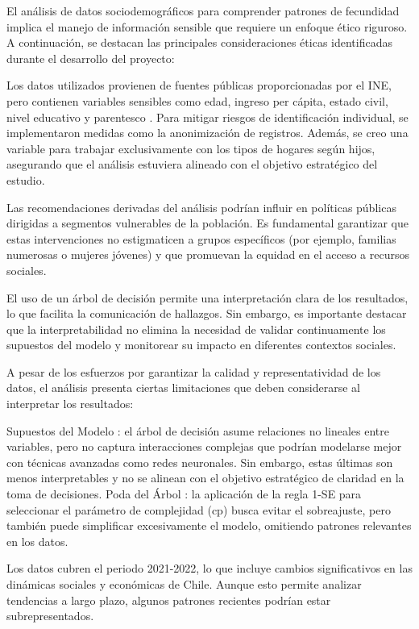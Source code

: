 \documentclass[
]{article}
\begin{document}
El análisis de datos sociodemográficos para comprender patrones de
fecundidad implica el manejo de información sensible que requiere un
enfoque ético riguroso. A continuación, se destacan las principales
consideraciones éticas identificadas durante el desarrollo del proyecto:

Los datos utilizados provienen de fuentes públicas proporcionadas por el
INE, pero contienen variables sensibles como edad, ingreso per cápita,
estado civil, nivel educativo y parentesco . Para mitigar riesgos de
identificación individual, se implementaron medidas como la
anonimización de registros. Además, se creo una variable para trabajar
exclusivamente con los tipos de hogares según hijos, asegurando que el
análisis estuviera alineado con el objetivo estratégico del estudio.

Las recomendaciones derivadas del análisis podrían influir en políticas
públicas dirigidas a segmentos vulnerables de la población. Es
fundamental garantizar que estas intervenciones no estigmaticen a grupos
específicos (por ejemplo, familias numerosas o mujeres jóvenes) y que
promuevan la equidad en el acceso a recursos sociales.

El uso de un árbol de decisión permite una interpretación clara de los
resultados, lo que facilita la comunicación de hallazgos. Sin embargo,
es importante destacar que la interpretabilidad no elimina la necesidad
de validar continuamente los supuestos del modelo y monitorear su
impacto en diferentes contextos sociales.

A pesar de los esfuerzos por garantizar la calidad y representatividad
de los datos, el análisis presenta ciertas limitaciones que deben
considerarse al interpretar los resultados:

Supuestos del Modelo : el árbol de decisión asume relaciones no lineales
entre variables, pero no captura interacciones complejas que podrían
modelarse mejor con técnicas avanzadas como redes neuronales. Sin
embargo, estas últimas son menos interpretables y no se alinean con el
objetivo estratégico de claridad en la toma de decisiones. Poda del
Árbol : la aplicación de la regla 1-SE para seleccionar el parámetro de
complejidad (cp) busca evitar el sobreajuste, pero también puede
simplificar excesivamente el modelo, omitiendo patrones relevantes en
los datos.

Los datos cubren el periodo 2021-2022, lo que incluye cambios
significativos en las dinámicas sociales y económicas de Chile. Aunque
esto permite analizar tendencias a largo plazo, algunos patrones
recientes podrían estar subrepresentados.
\end{document}
